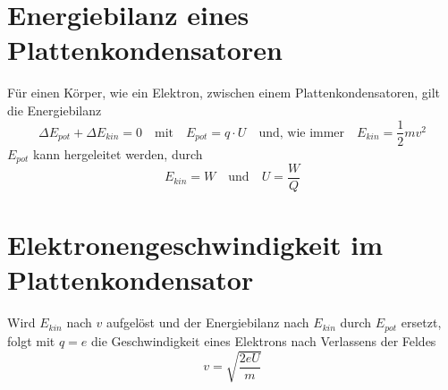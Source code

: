 \documentclass{article}
\begin{document}
  
 
\section{Energiebilanz eines Plattenkondensatoren}
Für einen Körper, wie ein Elektron, zwischen einem Plattenkondensatoren, gilt die Energiebilanz
\[
 \Delta E_{pot} + \Delta E_{kin} = 0
 \quad \text{mit} \quad
 E_{pot} = q \cdot U
 \quad \text{und, wie immer} \quad
 E_{kin} = \frac{1}{2} mv^2
\] 
$E_{pot}$ kann hergeleitet werden, durch 
\[
 E_{kin} = W
 \quad \text{und} \quad
 U = \frac{W}{Q} 
\]
 
\section{Elektronengeschwindigkeit im Plattenkondensator} 
Wird $E_{kin}$ nach $v$ aufgelöst und der Energiebilanz nach $E_{kin}$ durch $E_{pot}$ ersetzt, folgt mit $q=e$ die Geschwindigkeit eines Elektrons nach Verlassens der Feldes
\[
 v = \sqrt{\frac{2 eU}{m}}
\] 
 
\end{document}
